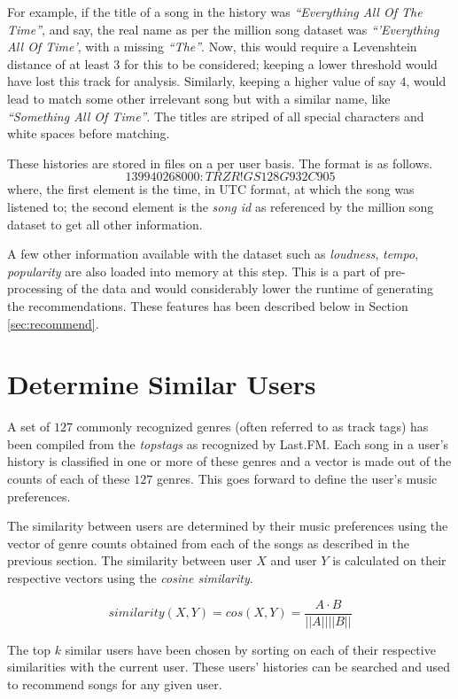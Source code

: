 		For example, if the title of a song in the history was \emph{``Everything All Of The Time''}, and say, the real name as per the million song dataset was \emph{``'Everything All Of Time'}, with a missing \emph{``The''}. Now, this would require a Levenshtein distance of at least \(3\) for this to be considered; keeping a lower threshold would have lost this track for analysis. Similarly, keeping a higher value of say \(4\), would lead to match some other irrelevant song but with a similar name, like \emph{``Something All Of Time''}. The titles are striped of all special characters and white spaces before matching.
		
		These histories are stored in files on a per user basis. The format is as follows.
		\[ 139940268000 : TRZR!GS128G932C905 \]
		where, the first element is the time, in UTC format, at which the song was listened to; the second element is the \emph{song id} as referenced by the million song dataset to get all other information.
		
		A few other information available with the dataset such as \emph{loudness}, \emph{tempo}, \emph{popularity} are also loaded into memory at this step. This is a part of pre-processing of the data and would considerably lower the runtime of generating the recommendations. These features has been described below in Section \ref{sec:recommend}.
	
	\section{Determine Similar Users}
		A set of \(127\) commonly recognized genres (often referred to as track tags) has been compiled from the \emph{topstags} as recognized by Last.FM. Each song in a user's history is classified in one or more of these genres and a vector is made out of the counts of each of these \(127\) genres. This goes forward to define the user's music preferences.
	
		The similarity between users are determined by their music preferences using the vector of genre counts obtained from each of the songs as described in the previous section. The similarity between user \(X\) and user \(Y\) is calculated on their respective vectors using the \emph{cosine similarity}.
		
		\[ similarity (X, Y) = cos (X, Y) = \frac{A \cdot B}{||A|| ||B||} \]
		
		The top \(k\) similar users have been chosen by sorting on each of their respective similarities with the current user. These users' histories can be searched and used to recommend songs for any given user. 
	
